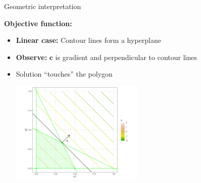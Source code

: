 \documentclass[11pt,compress,t,notes=noshow, xcolor=table]{beamer}
\begin{document}
\begin{vbframe}{Geometric interpretation}
\framebreak

\textbf{Objective function:}
\begin{itemize}
    \item \textbf{Linear case:} Contour lines form a hyperplane
    \item \textbf{Observe:} $\mathbf{c}$ is gradient and perpendicular to contour lines






\item Solution \enquote{touches} the polygon

\medskip

\begin{center}
    \includegraphics[width=0.5\textwidth]{figure_man/cons-opposite-direction.png}
\end{center}


\end{itemize}
\end{vbframe}
\end{document}
